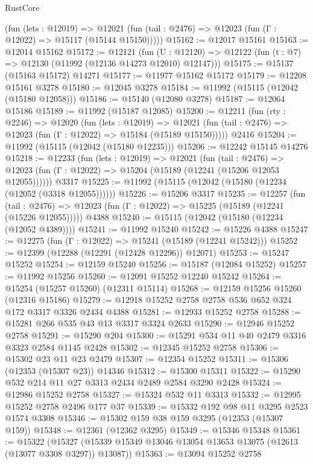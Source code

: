 \begin{lexlean}{RustCore}
\begin{coremodule}
      (fun (lets : @12019) =>
      @12021 (fun (tail : @2476) => @12023 (fun (Γ : @12022) => @15117 (@15144 @15150)))))
@15162 := @12017 @15161
@15163 := @12014 @15162
@15172 := @12121
    (fun (U : @12120) => @12122 (fun (t : @7) => @12130 (@11992 (@12136 @14273 @12010) @12147)))
@15175 := @15137 (@15163 @15172) @14271
@15177 := @11977 @15162 @15172
@15179 := @12208 @15161 @3278
@15180 := @12045 @3278
@15184 := @11992 (@15115 (@12042 (@15180 @12058)))
@15186 := @15140 (@12080 @3278)
@15187 := @12064 @15186
@15189 := @11992 (@15187 @12085)
@15200 := @12211
    (fun (rty : @2246) =>
    @12020
      (fun (lets : @12019) =>
      @12021 (fun (tail : @2476) => @12023 (fun (Γ : @12022) => @15184 (@15189 @15150)))))
    @2416
@15204 := @11992 (@15115 (@12042 (@15180 @12235)))
@15206 := @12242 @15145 @14276
@15218 := @12233
    (fun (lets : @12019) =>
    @12021
      (fun (tail : @2476) =>
      @12023 (fun (Γ : @12022) => @15204 (@15189 (@12241 (@15206 @12053 @12055))))))
    @3317
@15225 := @11992 (@15115 (@12042 (@15180 (@12234 (@12052 (@3318 @12055))))))
@15226 := @15206 @3317
@15235 := @12257
    (fun (tail : @2476) => @12023 (fun (Γ : @12022) => @15225 (@15189 (@12241 (@15226 @12055)))))
    @4388
@15240 := @15115 (@12042 (@15180 (@12234 (@12052 @4389))))
@15241 := @11992 @15240
@15242 := @15226 @4388
@15247 := @12275 (fun (Γ : @12022) => @15241 (@15189 (@12241 @15242)))
@15252 := @12399 (@12288 (@12291 (@12428 @12296)) @12071)
@15253 := @15247 @15252
@15254 := @12159 @15240
@15256 := @15187 (@12084 @15252)
@15257 := @11992 @15256
@15260 := @12091 @15252 @12240 @15242
@15264 := @15254 (@15257 @15260) (@12311 @15114)
@15268 := @12159 @15256 @15260 (@12316 @15186)
@15279 := @12918 @15252 @2758 @2758 @536 @652 @324 @172 @3317 @3326 @2434 @4388
@15281 := @12933 @15252 @2758
@15288 := @15281 @266 @535 @43 @13 @3317 @3324 @2633
@15290 := @12946 @15252 @2758
@15291 := @15290 @204
@15300 := @15291 @534 @11 @40 @2479 @3316 @3323 @2584 @1145 @2428
@15302 := @12345 @15252 @2758
@15306 := @15302 @23 @11 @23 @2479
@15307 := @12354 @15252
@15311 := @15306 (@12353 (@15307 @23)) @14346
@15312 := @15300 @15311
@15322 := @15290 @532 @214 @11 @27 @3313 @2434 @2489 @2584 @3290 @2428
@15324 := @12986 @15252 @2758
@15327 := @15324 @532 @11 @3313
@15332 := @12995 @15252 @2758 @2496 @177 @37
@15339 := @15332 @192 @98 @11 @3295 @2523 @1574 @3308
@15346 := @15302 @159 @38 @159 @3295 (@12353 (@15307 @159))
@15348 := @12361 (@12362 @3295)
@15349 := @15346 @15348
@15361 := @15322
    (@15327 (@15339 @15349 @13046 @13054 @13653 @13075 (@12613 (@13077 @3308 @3297)) @13087))
@15363 := @13094 @15252 @2758

\end{coremodule}
\end{lexlean}

